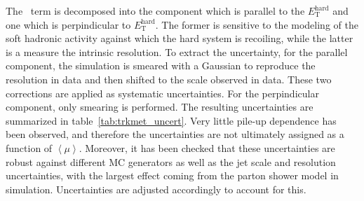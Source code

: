 The \ptsoft~term is decomposed into the component which is parallel to
the $E_{\mathrm {T}}^{\mathrm {hard}}$ and one which is perpindicular
to $E_{\mathrm {T}}^{\mathrm {hard}}$. The former is sensitive to the
modeling of the soft hadronic activity against which the hard system
is recoiling, while the latter is a measure the intrinsic \ptsoft
resolution. To extract the uncertainty, for the parallel component,
the simulation is smeared with a Gaussian to reproduce the resolution
in data and then shifted to the scale observed in data. These two
corrections are applied as systematic uncertainties. For the
perpindicular component, only smearing is performed. The resulting
uncertainties are summarized in table~\ref{tab:trkmet_uncert}. Very
little pile-up dependence has been observed, and therefore the
uncertainties are not ultimately assigned as a function of $\left
\langle \mu \right \rangle$. Moreover, it has been checked that these
uncertainties are robust against different MC generators as well as
the jet scale and resolution uncertainties, with the largest effect
coming from the parton shower model in simulation. Uncertainties are
adjusted accordingly to account for this. 

\begin{table}
\centering
{}
\caption{The absolute systematic variations (\gev) on the \ptsoft~term
  of \trkmet. Scale and
  resolution uncertainties are shown in bins of $E_{\mathrm
    {T}}^{\mathrm {hard}}$. The scale uncertainty corresponds to the
  shift factor which is applied to the parallel projection of
  \ptsoft~in simulation. The resolution uncertainties, split into the
  parallel and perpindicular components, correspond to additional
  smearing applied to the soft terms to match the width of the
  distribution observed in data.} 
\label{tab:trkmet_uncert}
\end{table}

